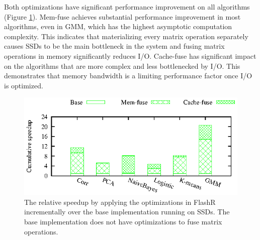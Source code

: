 Both optimizations have significant performance improvement on all algorithms
(Figure \ref{perf:em_opts}). Mem-fuse achieves
substantial performance improvement in most algorithms, even in GMM,
which has the highest asymptotic computation complexity.
This indicates that materializing every matrix operation
separately causes SSDs to be the main bottleneck in the system and
fusing matrix operations in memory significantly reduces I/O.
Cache-fuse has significant impact
on the algorithms that are more complex and less bottlenecked by I/O.
This demonstrates that memory bandwidth is a limiting performance factor
once I/O is optimized.

\begin{figure}
	\begin{center}
		\footnotesize
		\includegraphics{FlashMatrix_figs/opts-EM.eps}
		\vspace{-10pt}
		\caption{The relative speedup by applying the optimizations in FlashR
                incrementally over the base implementation running on SSDs.
		The base implementation does not have optimizations to fuse
                matrix operations.}
		\label{perf:em_opts}
	\end{center}
  \vspace{-15pt}
\end{figure}
